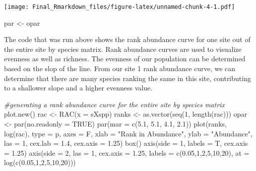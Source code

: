 \documentclass[
]{article}
\newenvironment{Shaded}{\begin{snugshade}}{\end{snugshade}}
\newcommand{\AttributeTok}[1]{\textcolor[rgb]{0.77,0.63,0.00}{#1}}
\newcommand{\CommentTok}[1]{\textcolor[rgb]{0.56,0.35,0.01}{\textit{#1}}}
\newcommand{\ConstantTok}[1]{\textcolor[rgb]{0.00,0.00,0.00}{#1}}
\newcommand{\DecValTok}[1]{\textcolor[rgb]{0.00,0.00,0.81}{#1}}
\newcommand{\FloatTok}[1]{\textcolor[rgb]{0.00,0.00,0.81}{#1}}
\newcommand{\FunctionTok}[1]{\textcolor[rgb]{0.00,0.00,0.00}{#1}}
\newcommand{\NormalTok}[1]{#1}
\newcommand{\OtherTok}[1]{\textcolor[rgb]{0.56,0.35,0.01}{#1}}
\newcommand{\StringTok}[1]{\textcolor[rgb]{0.31,0.60,0.02}{#1}}
\begin{document}
\texttt{[image: Final\_Rmarkdown\_files/figure-latex/unnamed-chunk-4-1.pdf]}

\begin{Shaded}
\begin{Highlighting}[]
\NormalTok{par }\OtherTok{\textless{}{-}}\NormalTok{ opar}
\end{Highlighting}
\end{Shaded}

The code that was run above shows the rank abundance curve for one site
out of the entire site by species matrix. Rank abundance curves are used
to visualize evenness as well as richness. The evenness of our
population can be determined based on the slop of the line. From our
site 1 rank abundance curve, we can determine that there are many
species ranking the same in this site, contributing to a shallower slope
and a higher evenness value.

\begin{Shaded}
\begin{Highlighting}[]
\CommentTok{\#generating a rank abundance curve for the entire site by species matrix}
\FunctionTok{plot.new}\NormalTok{()}
\NormalTok{rac }\OtherTok{\textless{}{-}} \FunctionTok{RAC}\NormalTok{(}\AttributeTok{x =}\NormalTok{ sXspp)}
\NormalTok{ranks }\OtherTok{\textless{}{-}} \FunctionTok{as.vector}\NormalTok{(}\FunctionTok{seq}\NormalTok{(}\DecValTok{1}\NormalTok{, }\FunctionTok{length}\NormalTok{(rac)))}
\NormalTok{opar }\OtherTok{\textless{}{-}} \FunctionTok{par}\NormalTok{(}\AttributeTok{no.readonly =} \ConstantTok{TRUE}\NormalTok{)}
\FunctionTok{par}\NormalTok{(}\AttributeTok{mar =} \FunctionTok{c}\NormalTok{(}\FloatTok{5.1}\NormalTok{, }\FloatTok{5.1}\NormalTok{, }\FloatTok{4.1}\NormalTok{, }\FloatTok{2.1}\NormalTok{))}
\FunctionTok{plot}\NormalTok{(ranks, }\FunctionTok{log}\NormalTok{(rac), }\AttributeTok{type =} \StringTok{\textquotesingle{}p\textquotesingle{}}\NormalTok{, }\AttributeTok{axes =}\NormalTok{ F,}
     \AttributeTok{xlab =} \StringTok{"Rank in Abundance"}\NormalTok{, }\AttributeTok{ylab =} \StringTok{"Abundance"}\NormalTok{,}
     \AttributeTok{las =} \DecValTok{1}\NormalTok{, }\AttributeTok{cex.lab =} \FloatTok{1.4}\NormalTok{, }\AttributeTok{cex.axis =} \FloatTok{1.25}\NormalTok{)}
\FunctionTok{box}\NormalTok{()}
\FunctionTok{axis}\NormalTok{(}\AttributeTok{side =} \DecValTok{1}\NormalTok{, }\AttributeTok{labels =}\NormalTok{ T, }\AttributeTok{cex.axis =} \FloatTok{1.25}\NormalTok{)}
\FunctionTok{axis}\NormalTok{(}\AttributeTok{side =} \DecValTok{2}\NormalTok{, }\AttributeTok{las =} \DecValTok{1}\NormalTok{, }\AttributeTok{cex.axis =} \FloatTok{1.25}\NormalTok{,}
     \AttributeTok{labels =} \FunctionTok{c}\NormalTok{(}\FloatTok{0.05}\NormalTok{,}\DecValTok{1}\NormalTok{,}\DecValTok{2}\NormalTok{,}\DecValTok{5}\NormalTok{,}\DecValTok{10}\NormalTok{,}\DecValTok{20}\NormalTok{), }\AttributeTok{at =} \FunctionTok{log}\NormalTok{(}\FunctionTok{c}\NormalTok{(}\FloatTok{0.05}\NormalTok{,}\DecValTok{1}\NormalTok{,}\DecValTok{2}\NormalTok{,}\DecValTok{5}\NormalTok{,}\DecValTok{10}\NormalTok{,}\DecValTok{20}\NormalTok{)))}
\end{Highlighting}
\end{Shaded}
\end{document}
